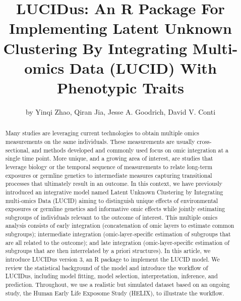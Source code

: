 \title{LUCIDus: An R Package For Implementing Latent Unknown Clustering By Integrating Multi-omics Data (LUCID) With Phenotypic Traits}
\author{by Yinqi Zhao, Qiran Jia, Jesse A. Goodrich, David V. Conti}
\maketitle
\begin{abstract}
Many studies are leveraging current technologies to obtain multiple omics measurements on the same individuals. These measurements are usually cross-sectional, and methods developed and commonly used focus on omic integration at a single time point. More unique, and a growing area of interest, are studies that leverage biology or the temporal sequence of measurements to relate long-term exposures or germline genetics to intermediate measures capturing transitional processes that ultimately result in an outcome. In this context, we have previously introduced an integrative model named Latent Unknown Clustering by Integrating multi-omics Data (LUCID) aiming to distinguish unique effects of environmental exposures or germline genetics and informative omic effects while jointly estimating subgroups of individuals relevant to the outcome of interest. This multiple omics analysis consists of early integration (concatenation of omic layers to estimate common subgroups); intermediate integration (omic-layer-specific estimation of subgroups that are all related to the outcome); and late integration (omic-layer-specific estimation of subgroups that are then interrelated by a priori structures). In this article, we introduce LUCIDus version 3, an R package to implement the LUCID model. We review the statistical background of the model and introduce the workflow of LUCIDus, including model fitting, model selection, interpretation, inference, and prediction. Throughout, we use a realistic but simulated dataset based on an ongoing study, the Human Early Life Exposome Study (HELIX), to illustrate the workflow.
\end{abstract}
